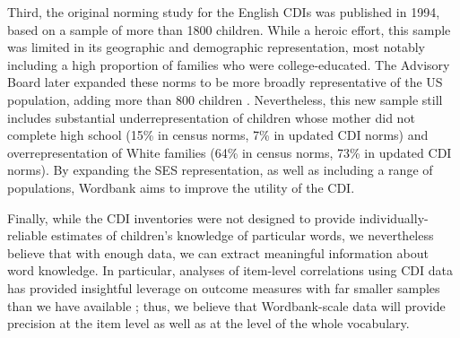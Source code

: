 \documentclass[man,noapacite]{apa2}
\begin{document}
Third, the original norming study for the English CDIs was published in 1994, based on a sample of more than 1800 children. While a heroic effort, this sample was limited in its geographic and demographic representation, most notably including a high proportion of families who were college-educated. The Advisory Board later expanded these norms to be more broadly representative of the US population, adding more than 800 children \cite{fenson2007}. Nevertheless, this new sample still includes substantial underrepresentation of children whose mother did not complete high school (15\% in census norms, 7\% in updated CDI norms) and overrepresentation of White families (64\% in census norms, 73\% in updated CDI norms). By expanding the SES representation, as well as including a range of populations, Wordbank aims to improve the utility of the CDI.

Finally, while the CDI inventories were not designed to provide individually-reliable estimates of children's knowledge of particular words, we nevertheless believe that with enough data, we can extract meaningful information about word knowledge. In particular, analyses of item-level correlations using CDI data has provided insightful leverage on outcome measures with far smaller samples than we have available \cite{hills2009,hills2009b,hills2010,beckage2011}; thus, we believe that Wordbank-scale data will provide precision at the item level as well as at the level of the whole vocabulary.




\end{document}
